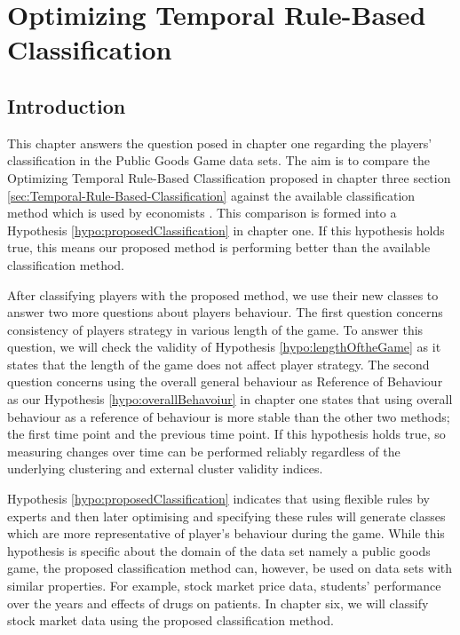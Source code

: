 
\chapter{Optimizing Temporal Rule-Based Classification}
\label{Chap:Optimizing}

\section{Introduction}

This chapter answers the question posed in chapter one regarding the players' classification in the Public Goods Game data sets. The aim is to compare the Optimizing Temporal Rule-Based Classification proposed in chapter three section  \ref{sec:Temporal-Rule-Based-Classification} against the available classification method which is used by economists \cite{Fischbacher2001}. This comparison is formed into a Hypothesis \ref{hypo:proposedClassification} in chapter one. If this hypothesis holds true, this means our proposed method is performing better than the available classification method.

After classifying players with the proposed method, we use their new classes to answer two more questions about players behaviour. The first question concerns consistency of players strategy in various length of the game. To answer this question, we will check the validity of Hypothesis \ref{hypo:lengthOftheGame} as it states that the length of the game does not affect player strategy. The second question concerns using the overall general behaviour as Reference of Behaviour as our Hypothesis \ref{hypo:overallBehavoiur} in chapter one states that using overall behaviour as a reference of behaviour is more stable than the other two methods; the first time point and the previous time point. If this hypothesis holds true, so measuring changes over time can be performed reliably regardless of the underlying clustering and external cluster validity indices.

 

Hypothesis \ref{hypo:proposedClassification} indicates that using flexible rules by experts and then later optimising and specifying these rules will generate classes which are more representative of player's behaviour during the game. While this hypothesis is specific about the domain of the data set namely a public goods game, the proposed classification method can, however, be used on data sets with similar properties.  For example, stock market price data, students' performance over the years and effects of drugs on patients. In chapter six, we will classify stock market data using the proposed classification method.

